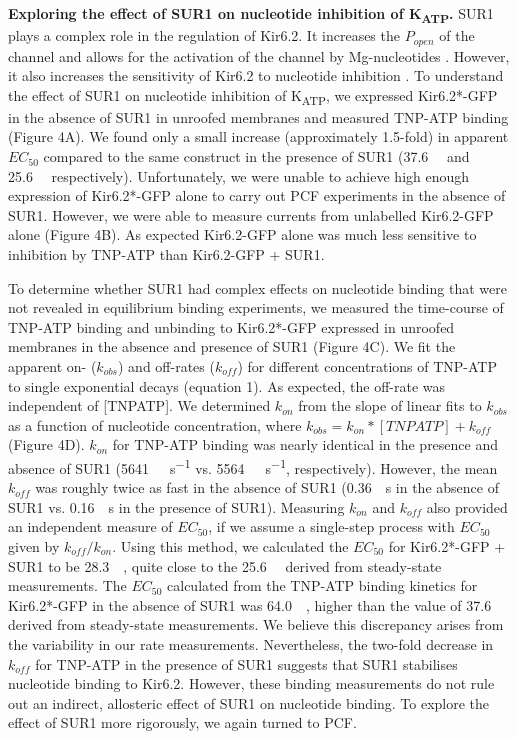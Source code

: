 \documentclass[10pt,lineno, doublespacing]{elife_modified}
\begin{document}
\textbf{Exploring the effect of SUR1 on nucleotide inhibition of K\textsubscript{ATP}.}
SUR1 plays a complex role in the regulation of Kir6.2.
It increases the $P_{open}$ of the channel and allows for the activation of the channel by Mg-nucleotides \citep{RN59, RN10, RN83, RN77, RN85}.
However, it also increases the sensitivity of Kir6.2 to nucleotide inhibition \citep{RN83, RN77, RN85}.
To understand the effect of SUR1 on nucleotide inhibition of K\textsubscript{ATP}, we expressed Kir6.2*-GFP in the absence of SUR1 in unroofed membranes and measured TNP-ATP binding (Figure 4A).
We found only a small increase (approximately 1.5-fold) in apparent $EC_{50}$ compared to the same construct in the presence of SUR1 (\SI{37.6}{\micro\Molar} and \SI{25.6}{\micro\Molar} respectively).
Unfortunately, we were unable to achieve high enough expression of Kir6.2*-GFP alone to carry out PCF experiments in the absence of SUR1.
However, we were able to measure currents from unlabelled Kir6.2-GFP alone (Figure 4B).
As expected Kir6.2-GFP alone was much less sensitive to inhibition by TNP-ATP than Kir6.2-GFP + SUR1.

To determine whether SUR1 had complex effects on nucleotide binding that were not revealed in equilibrium binding experiments, we measured the time-course of TNP-ATP binding and unbinding to Kir6.2*-GFP expressed in unroofed membranes in the absence and presence of SUR1 (Figure 4C).
We fit the apparent on- ($k_{obs}$) and off-rates ($k_{off}$) for different concentrations of TNP-ATP to single exponential decays (equation 1).
As expected, the off-rate was independent of [TNPATP].
We determined $k_{on}$ from the slope of linear fits to $k_{obs}$ as a function of nucleotide concentration, where $k_{obs} = k_{on}*[TNPATP] + k_{off}$ (Figure 4D).
$k_{on}$ for TNP-ATP binding was nearly identical in the presence and absence of SUR1 (\SI{5641}{\per\Molar\per\second} vs. \SI{5564}{\per\Molar\per\second}, respectively).
However, the mean $k_{off}$ was roughly twice as fast in the absence of SUR1 (\SI{0.36}{\per\second} in the absence of SUR1 vs. \SI{0.16}{\per\second} in the presence of SUR1).
Measuring $k_{on}$ and $k_{off}$ also provided an independent measure of $EC_{50}$, if we assume a single-step process with $EC_{50}$ given by $k_{off}/k_{on}$.
Using this method, we calculated the $EC_{50}$ for Kir6.2*-GFP + SUR1 to be \SI{28.3}{\micro\Molar}, quite close to the \SI{25.6}{\micro\Molar} derived from steady-state measurements.
The $EC_{50}$ calculated from the TNP-ATP binding kinetics for Kir6.2*-GFP in the absence of SUR1 was \SI{64.0}{\micro\Molar}, higher than the value of \SI{37.6}{\micro\Molar} derived from steady-state measurements.
We believe this discrepancy arises from the variability in our rate measurements.
Nevertheless, the two-fold decrease in $k_{off}$ for TNP-ATP in the presence of SUR1 suggests that SUR1 stabilises nucleotide binding to Kir6.2.
However, these binding measurements do not rule out an indirect, allosteric effect of SUR1 on nucleotide binding.
To explore the effect of SUR1 more rigorously, we again turned to PCF.
\end{document}
